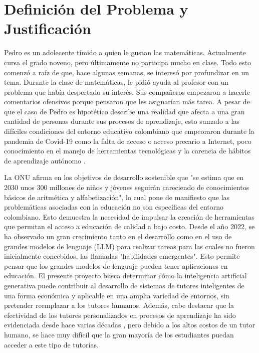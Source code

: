 
\chapter{Definición del Problema y Justificación}

Pedro es un adolecente tímido a quien le gustan las matemáticas. Actualmente cursa el grado noveno, pero últimamente no participa mucho en clase. Todo esto comenzó a raíz de que, hace algunas semanas, se interesó por profundizar en un tema. Durante la clase de matemáticas, le pidió ayuda al profesor con un problema que había despertado su interés. Sus compañeros empezaron a hacerle comentarios ofensivos porque pensaron que les asignarían más tarea. A pesar de que el caso de Pedro es hipotético describe una realidad que afecta a una gran cantidad de personas durante sus procesos de aprendizaje, esto sumado a las difíciles condiciones del entorno educativo colombiano que empeoraron durante la pandemia de Covid-19 como la falta de acceso o acceso precario a Internet, poco conocimiento en el manejo de herramientas tecnológicas y la carencia de hábitos de aprendizaje autónomo \cite{VisDificultadesMonteroMahecha_2021}.

La ONU afirma \cite{ONU2024} en los objetivos de desarrollo sostenible que "se estima que en 2030 unos 300 millones de niños y jóvenes seguirán careciendo de conocimientos básicos de aritmética y alfabetización", lo cual pone de manifiesto que las problemáticas asociadas con la educación no son específicas del entorno colombiano. Esto demuestra la necesidad de impulsar la creación de herramientas que permitan el acceso a educación de calidad a bajo costo. Desde el año 2022, se ha observado un gran crecimiento tanto en el desarrollo como en el uso de grandes modelos de lenguaje (LLM) para realizar tareas para las cuales no fueron inicialmente concebidos, las llamadas "habilidades emergentes". Esto permite pensar que los grandes modelos de lenguaje pueden tener aplicaciones en educación. El presente proyecto busca determinar cómo la inteligencia artificial generativa puede contribuir al desarrollo de sistemas de tutores inteligentes de una forma económica y aplicable en una amplia variedad de entornos, sin pretender reemplazar a los tutores humanos. Además, cabe destacar que la efectividad de los tutores personalizados en procesos de aprendizaje ha sido evidenciada desde hace varias décadas \cite{BLOOM1984}, pero debido a los altos costos de un tutor humano, se hace muy difícil que la gran mayoría de los estudiantes puedan acceder a este tipo de tutorías.
